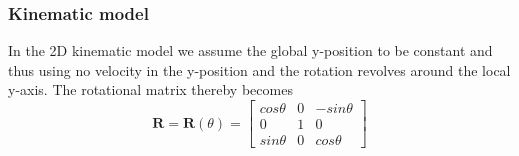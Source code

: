 \subsubsection{Kinematic model}
In the 2D kinematic model we assume the global y-position to be constant and thus using no velocity in the y-position and the rotation revolves around the local y-axis. The rotational matrix thereby becomes
\begin{equation}
    \textbf{R} = \textbf{R}(\theta) = \begin{bmatrix}
        cos \theta   &   0   &   -sin \theta \\
        0            &   1   &   0\\
        sin \theta   &   0   &   cos \theta
    \end{bmatrix}
\end{equation}

